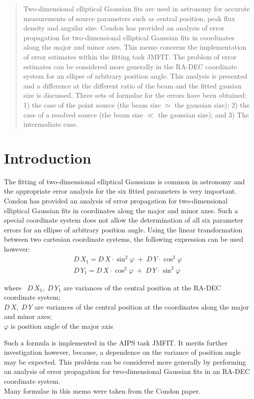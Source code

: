 \maketitle

\vspace{5mm}
\begin{abstract}
 Two-dimensional elliptical Gaussian fits are used in astronomy for
accurate measurements of source parameters such as central position,
peak flux density and angular size. Condon \cite{jjcon} has provided
an analysis of error propagation for two-dimensional elliptical
Gaussian fits in coordinates along the major and minor axes. This memo
concerns the implementation of error estimates within the fitting task
JMFIT. The problem of error estimates can be considered more generally
in the RA-DEC coordinate system for an ellipse of arbitrary position
angle. This analysis is presented and a difference at the different
ratio of the beam  and the fitted gausian size is discussed. Three
sets of formulae for the errors have been obtained: 1) the case of the
point source (the beam size $\simeq$ the gaussian size); 2) the case
of a resolved source (the beam size $\ll$ the gaussian size); and 3)
The intermediate case.

\end{abstract}
\section{Introduction}
The fitting of two-dimensional elliptical Gaussians is common in
astronomy and the appropriate error analysis for the six fitted
parameters is very important. Condon \cite{jjcon} has provided an
analysis of error propagation for two-dimensional elliptical Gaussian
fits in coordinates along the major and minor axes. Such a special
coordinate system does not allow the determination of all six
parameter errors for an ellipse of arbitrary position angle. Using the
linear transformation between two cartesian coordinate systems, the
following expression can be used however:
\begin{eqnarray}
    D\,X_1 = D\,X \cdot \sin^2 \varphi \;+\; D\,Y \cdot \cos^2 \varphi
       \nonumber \\
    D\,Y_1 = D\,X \cdot \cos^2 \varphi \;+\; D\,Y \cdot \sin^2 \varphi
\end{eqnarray}
\begin{tabbing}
where~ \= \(D\,X_1,\; D\,Y_1\) are variances of the central position at the RA-DEC coordinate system;\\
       \> \(D\,X,\; D\,Y\) are variances of the central position at the
          coordinates along the major \\
       \> and minor axes;\\
       \> \( \varphi\) is position angle of the major axis
\end{tabbing}
Such a formula is implemented in the AIPS task JMFIT. It merits
further investigation however, because, a dependence on the variance
of position angle may be expected. This problem can be considered more
generally by performing an analysis of error propagation for
two-dimensional Gaussian fits in an RA-DEC coordinate system.\\
Many formulae in this memo were taken from the Condon \cite{jjcon} paper.
